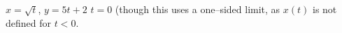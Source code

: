 {$x=\sqrt{t}$, $y=5t+2$}
{$t=0$ (though this uses a one--sided limit, as $x(t)$ is not defined for $t<0$.
}
